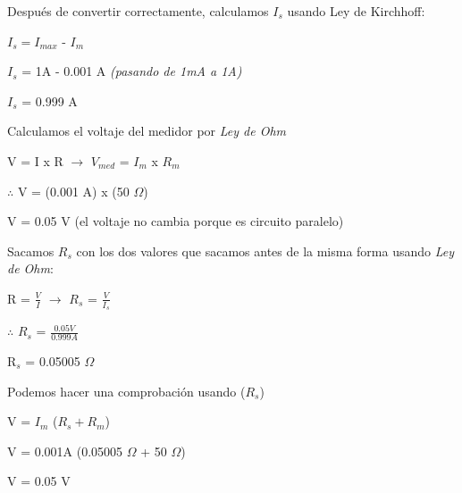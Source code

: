 \documentclass[a4paper,11pt]{article}
\begin{document}
\noindent Después de convertir correctamente, calculamos $I_s$ usando Ley de Kirchhoff:

\begin{center}
    $I_s = $$I_{max}$ - $I_m$
    
    $I_s$ = 1A - 0.001 A \textit{(pasando de 1mA a 1A)} 
    
    $I_s$ = 0.999 A
    
\end{center}
\noindent Calculamos el voltaje del medidor por \textit{Ley de Ohm}

\begin{center}
    V = I x R $\rightarrow$ $V_{med}$ = $I_{m}$ x $R_m$
    
    $\therefore$ V = (0.001 A) x (50 $\Omega$)
    
    V = 0.05 V (el voltaje no cambia porque es circuito paralelo)
    
\end{center}
\noindent Sacamos $R_s$ con los dos valores que sacamos antes de la misma forma usando \textit{Ley de Ohm}: 

\begin{center}
    R = $\frac{V}{I}$ $\rightarrow$ $R_s$ = $\frac{V}{I_s}$ 
    
    $\therefore$ $R_s$ = $\frac{0.05 V}{0.999 A}$
    
    R$_s$ = 0.05005 $\Omega$
    
\end{center}
\noindent Podemos hacer una comprobación usando ($R_s$)
\begin{center}
    
    V = $I_m$ ($R_s + R_m$)
    
    V = 0.001A (0.05005 $\Omega$ + 50 $\Omega$)
    
    V = 0.05 V 
\end{center}

\end{document}
